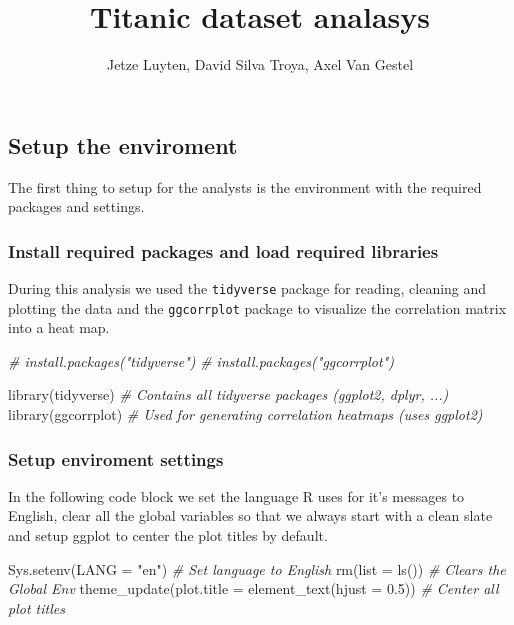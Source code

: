 \documentclass[
]{article}
\title{Titanic dataset analasys}
\author{Jetze Luyten, David Silva Troya, Axel Van Gestel}
\date{}
\newenvironment{Shaded}{\begin{snugshade}}{\end{snugshade}}
\newcommand{\AttributeTok}[1]{\textcolor[rgb]{0.77,0.63,0.00}{#1}}
\newcommand{\CommentTok}[1]{\textcolor[rgb]{0.56,0.35,0.01}{\textit{#1}}}
\newcommand{\FloatTok}[1]{\textcolor[rgb]{0.00,0.00,0.81}{#1}}
\newcommand{\FunctionTok}[1]{\textcolor[rgb]{0.00,0.00,0.00}{#1}}
\newcommand{\NormalTok}[1]{#1}
\newcommand{\StringTok}[1]{\textcolor[rgb]{0.31,0.60,0.02}{#1}}
\begin{document}
\maketitle

\hypertarget{setup-the-enviroment}{%
\subsection{Setup the enviroment}\label{setup-the-enviroment}}

The first thing to setup for the analysts is the environment with the
required packages and settings.

\hypertarget{install-required-packages-and-load-required-libraries}{%
\subsubsection{Install required packages and load required
libraries}\label{install-required-packages-and-load-required-libraries}}

During this analysis we used the \texttt{tidyverse} package for reading,
cleaning and plotting the data and the \texttt{ggcorrplot} package to
visualize the correlation matrix into a heat map.

\begin{Shaded}
\begin{Highlighting}[]
\CommentTok{\# install.packages("tidyverse")}
\CommentTok{\# install.packages("ggcorrplot")}

\FunctionTok{library}\NormalTok{(tidyverse) }\CommentTok{\# Contains all tidyverse packages (ggplot2, dplyr, ...)}
\FunctionTok{library}\NormalTok{(ggcorrplot) }\CommentTok{\# Used for generating correlation heatmaps (uses ggplot2)}
\end{Highlighting}
\end{Shaded}

\hypertarget{setup-enviroment-settings}{%
\subsubsection{Setup enviroment
settings}\label{setup-enviroment-settings}}

In the following code block we set the language R uses for it's messages
to English, clear all the global variables so that we always start with
a clean slate and setup ggplot to center the plot titles by default.

\begin{Shaded}
\begin{Highlighting}[]
\FunctionTok{Sys.setenv}\NormalTok{(}\AttributeTok{LANG =} \StringTok{"en"}\NormalTok{) }\CommentTok{\# Set language to English}
\FunctionTok{rm}\NormalTok{(}\AttributeTok{list =} \FunctionTok{ls}\NormalTok{()) }\CommentTok{\# Clears the Global Env}
\FunctionTok{theme\_update}\NormalTok{(}\AttributeTok{plot.title =} \FunctionTok{element\_text}\NormalTok{(}\AttributeTok{hjust =} \FloatTok{0.5}\NormalTok{)) }\CommentTok{\# Center all plot titles}
\end{Highlighting}
\end{Shaded}
\end{document}
